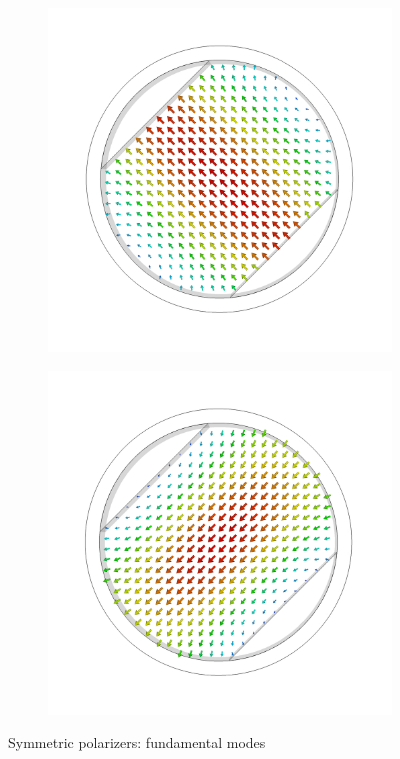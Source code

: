 \documentclass[11pt,a4paper,twoside,openany]{report}
\begin{document}
\begin{figure}
\begin{subfigure}{.45\textwidth}
        \includegraphics[width=.75\textwidth]{src/polarizer_circular_mode1.png}
        \caption{\label{fig:circular-polarizer-mode1}}
    \end{subfigure}
    \hspace{0.5cm}
    \begin{subfigure}{.45\textwidth}
        \centering
        \includegraphics[width=.75\textwidth]{src/polarizer_circular_mode2.png}
        \caption{\label{fig:circular-polarizer-mode2}}
    \end{subfigure}
    \caption{\label{fig:symmetric-polarizer-modes}Symmetric polarizers: fundamental modes}
\end{figure}
\end{document}
